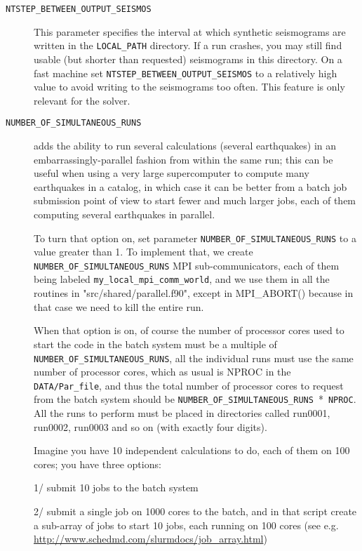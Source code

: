 \vspace{1cm}
\begin{description}
\item [{\texttt{NTSTEP\_BETWEEN\_OUTPUT\_SEISMOS}}] This parameter specifies
the interval at which synthetic seismograms are written in the \texttt{LOCAL\_PATH}
directory. If a run crashes, you may still find usable (but shorter
than requested) seismograms in this directory. On a fast machine set
\texttt{NTSTEP\_BETWEEN\_OUTPUT\_SEISMOS} to a relatively high value
to avoid writing to the seismograms too often. This feature is only
relevant for the solver.

\item [{\texttt{NUMBER\_OF\_SIMULTANEOUS\_RUNS}}] adds the ability to run several calculations (several earthquakes)
in an embarrassingly-parallel fashion from within the same run;
this can be useful when using a very large supercomputer to compute
many earthquakes in a catalog, in which case it can be better from
a batch job submission point of view to start fewer and much larger jobs,
each of them computing several earthquakes in parallel.

To turn that option on, set parameter \texttt{NUMBER\_OF\_SIMULTANEOUS\_RUNS} to a value greater than 1.
To implement that, we create \texttt{NUMBER\_OF\_SIMULTANEOUS\_RUNS} MPI sub-communicators,
each of them being labeled \texttt{my\_local\_mpi\_comm\_world}, and we use them
in all the routines in "src/shared/parallel.f90", except in MPI\_ABORT() because in that case
we need to kill the entire run.

When that option is on, of course the number of processor cores used to start
the code in the batch system must be a multiple of \texttt{NUMBER\_OF\_SIMULTANEOUS\_RUNS},
all the individual runs must use the same number of processor cores,
which as usual is NPROC in the \texttt{DATA/Par\_file},
and thus the total number of processor cores to request from the batch system
should be \texttt{NUMBER\_OF\_SIMULTANEOUS\_RUNS}~*~\texttt{NPROC}.
All the runs to perform must be placed in directories called run0001, run0002, run0003 and so on
(with exactly four digits).

Imagine you have 10 independent calculations to do, each of them on 100 cores; you have three options:

1/ submit 10 jobs to the batch system

2/ submit a single job on 1000 cores to the batch, and in that script create a sub-array of jobs to start 10 jobs,
each running on 100 cores (see e.g. \url{http://www.schedmd.com/slurmdocs/job_array.html})


\end{description}
